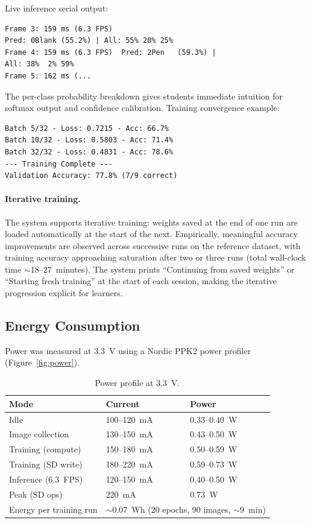 \documentclass[12pt]{article}
\begin{document}
Live inference serial output:

\begin{lstlisting}[language={}, caption={Live inference at 6.3~FPS.}]
Frame 3: 159 ms (6.3 FPS)
Pred: 0Blank (55.2%) | All: 55% 20% 25%
Frame 4: 159 ms (6.3 FPS)  Pred: 2Pen   (59.3%) |
All: 38%  2% 59%
Frame 5: 162 ms (...
\end{lstlisting}

The per-class probability breakdown gives students immediate intuition for
softmax output and confidence calibration.
Training convergence example:

\begin{lstlisting}[language={}, caption={Training output (serial monitor).}]
Batch 5/32 - Loss: 0.7215 - Acc: 66.7%
Batch 10/32 - Loss: 0.5803 - Acc: 71.4%
Batch 32/32 - Loss: 0.4831 - Acc: 78.6%
--- Training Complete ---
Validation Accuracy: 77.8% (7/9 correct)
\end{lstlisting}

\paragraph{Iterative training.}
The system supports iterative training: weights saved at the end of one run are
loaded automatically at the start of the next.
Empirically, meaningful accuracy improvements are observed across successive
runs on the reference dataset, with training accuracy approaching saturation
after two or three runs (total wall-clock time $\sim$18--27~minutes).
The system prints ``Continuing from saved weights'' or ``Starting fresh
training'' at the start of each session, making the iterative progression
explicit for learners.

\subsection{Energy Consumption}
\label{sec:energy}

Power was measured at 3.3~V using a Nordic PPK2 power profiler
(Figure~\ref{fig:power}).

\begin{table}[H]
\centering
\caption{Power profile at 3.3~V.}
\label{tab:power}
\begin{tabular}{lll}
\toprule
\textbf{Mode} & \textbf{Current} & \textbf{Power} \\
\midrule
Idle & 100--120~mA & 0.33--0.40~W \\
Image collection & 130--150~mA & 0.43--0.50~W \\
Training (compute) & 150--180~mA & 0.50--0.59~W \\
Training (SD write) & 180--220~mA & 0.59--0.73~W \\
Inference (6.3~FPS) & 120--150~mA & 0.40--0.50~W \\
Peak (SD ops) & 220~mA & 0.73~W \\
\midrule
Energy per training run & \multicolumn{2}{l}{$\sim$0.07~Wh (20 epochs, 90 images, $\sim$9~min)} \\
\bottomrule
\end{tabular}
\end{table}
\end{document}
